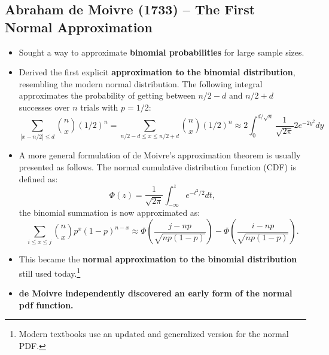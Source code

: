 \documentclass{article}
\begin{document}
\subsection{Abraham de Moivre (1733) – The First Normal Approximation}
\begin{itemize}
    \item Sought a way to approximate \textbf{binomial probabilities} for large sample sizes.
    \item Derived the first explicit \textbf{approximation to the binomial distribution}, resembling the modern normal distribution. The following integral approximates the probability of getting between $n/2 - d$ and $n/2 + d$ successes over $n$ trials with $p=1/2$:
    \begin{equation}
    \sum_{|x-n/2| \leq d} {n \choose x} (1/2)^n = \sum_{n/2 - d \leq x \leq n/2 + d   } {n \choose x} (1/2)^n \approx  2  \int_0^{d/\sqrt{n}} \frac{1}{\sqrt{2\pi}} 2 e^{-2y^2}  dy
    \end{equation}
    \item A more general formulation of de Moivre's approximation theorem is usually presented as follows. The normal cumulative distribution function (CDF) is defined as:
        \begin{equation}
        \Phi(z) = \frac{1}{\sqrt{2\pi}} \int_{-\infty}^{z} e^{-t^2/2} dt,
        \end{equation}
        the binomial summation is now approximated as:
        \begin{equation}
        \sum_{i \leq x \leq j} {n \choose x} p^x (1-p)^{n-x} \approx \Phi \left( \frac{j - np}{\sqrt{np(1-p)}} \right) - \Phi \left( \frac{i - np}{\sqrt{np(1-p)}} \right).
        \end{equation}
    \item This became the \textbf{normal approximation to the binomial distribution} still used today.\footnote{Modern textbooks use an updated and generalized version for the normal PDF.}
    \item \textbf{de Moivre independently discovered an early form of the normal pdf function.}
\end{itemize}
\end{document}

